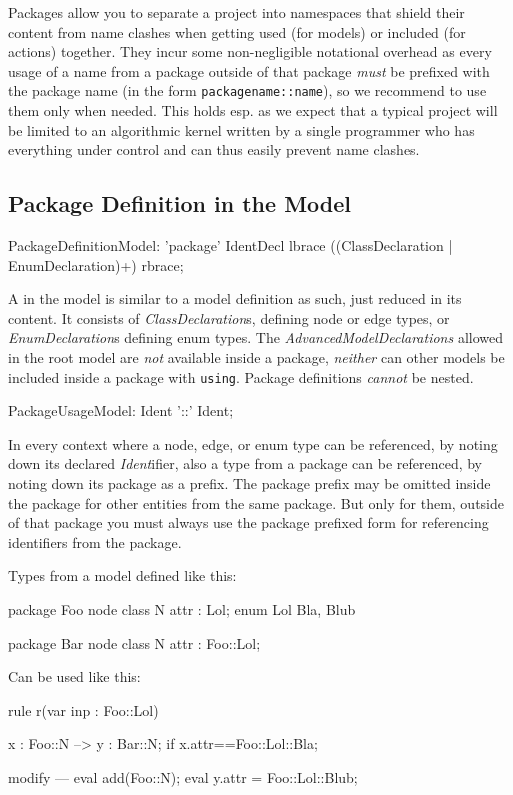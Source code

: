 Packages allow you to separate a project into namespaces that shield their content from name clashes when getting used (for models) or included (for actions) together.
They incur some non-negligible notational overhead as every usage of a name from a package outside of that package \emph{must} be prefixed with the package name (in the form \verb#packagename::name#), so we recommend to use them only when needed.
This holds esp. as we expect that a typical project will be limited to an algorithmic kernel written by a single programmer who has everything under control and can thus easily prevent name clashes.

\subsection{Package Definition in the Model}\label{sub:packagemodel} 

\begin{rail}
  PackageDefinitionModel: 'package' IdentDecl lbrace
	                   ((ClassDeclaration
  									 | EnumDeclaration)+)
										rbrace;
\end{rail}

A  in the model is similar to a model definition as such, just reduced in its content.
It consists of \emph{ClassDeclaration}s, defining node or edge types, or \emph{EnumDeclaration}s defining enum types.
The \emph{AdvancedModelDeclarations} allowed in the root model are \emph{not} available inside a package, \emph{neither} can other models be included inside a package with \texttt{using}.
Package definitions \emph{cannot} be nested.

\begin{rail}
  PackageUsageModel: Ident '::' Ident;
\end{rail}

In every context where a node, edge, or enum type can be referenced,
by noting down its declared \emph{Ident}ifier, 
also a type from a package can be referenced,
by noting down its package as a prefix.
The package prefix may be omitted inside the package for other entities from the same package.
But only for them, outside of that package you must always use the package prefixed form for referencing identifiers from the package.

\begin{example}
Types from a model defined like this:
	\begin{grgen}
package Foo {
	node class N {
		attr : Lol;
	}
	enum Lol {
		Bla,
		Blub
	}
}

package Bar {
	node class N {
		attr : Foo::Lol;
	}	
}
	\end{grgen}
Can be used like this:
	\begin{grgen}
rule r(var inp : Foo::Lol) {
	x : Foo::N --> y : Bar::N;
	if{ x.attr==Foo::Lol::Bla; }

	modify {
	---
		eval{ add(Foo::N); }
		eval{ y.attr = Foo::Lol::Blub; }
	}
}	
	\end{grgen}
\end{example}
	
